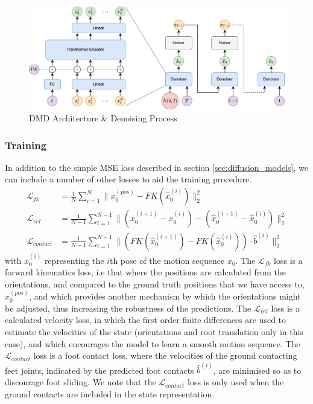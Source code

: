 \begin{figure}[!ht]
    \centering
    \includegraphics[width=1\textwidth]{Figures/diffusion/Network_diagram.png}
    \caption{DMD Architecture \& Denoising Process}
    \label{fig:dmd_architecture}
\end{figure}



\subsubsection{Training}
In addition to the simple MSE loss described in section \ref{sec:diffusion_models}, we can include a number of other losses to aid the training procedure.
\begin{equation}
    \begin{aligned}
        \mathcal{L}_{fk} &= \frac{1}{N} \sum_{i=1}^{N} \| x_0^{(pos)} - FK(\hat{x}_0^{(i)})  \|_2^2 \\
        \mathcal{L}_{vel} &= \frac{1}{N-1} \sum_{i=1}^{N-1} \| (x_0^{(i+1)} - x_0^{(i)}) - (\hat{x}_0^{(i+1)} - \hat{x}_0^{(i)}) \|_2^2 \\
        \mathcal{L}_{contact} &= \frac{1}{N-1} \sum_{i=1}^{N-1} \| \left( FK(\hat{x}_0^{(i+1)}) - FK(\hat{x}_0^{(i)}) \right) \cdot \hat{b}^{(i)}  \|_2^2
    \end{aligned}
\end{equation}
with $x_0^{(i)}$ representing the $i$th pose of the motion sequence $x_0$. The $\mathcal{L}_{fk}$ loss is a forward kinematics loss, i.e that where the positions are calculated from the orientations, and compared to the ground truth positions that we have access to, $x_0^{(pos)}$, and which provides another mechanism by which the orientations might be adjusted, thus increasing the robustness of the predictions. The $\mathcal{L}_{vel}$ loss is a calculated velocity loss, in which the first order finite differences are used to estimate the velocities of the state (orientations and root translation only in this case), and which encourages the model to learn a smooth motion sequence. The $\mathcal{L}_{contact}$ loss is a foot contact loss, where the velocities of the ground contacting feet joints, indicated by the predicted foot contacts $\hat{b}^{(i)}$, are minimised so as to discourage foot sliding. We note that the $\mathcal{L}_{contact}$ loss is only used when the ground contacts are included in the state representation.



